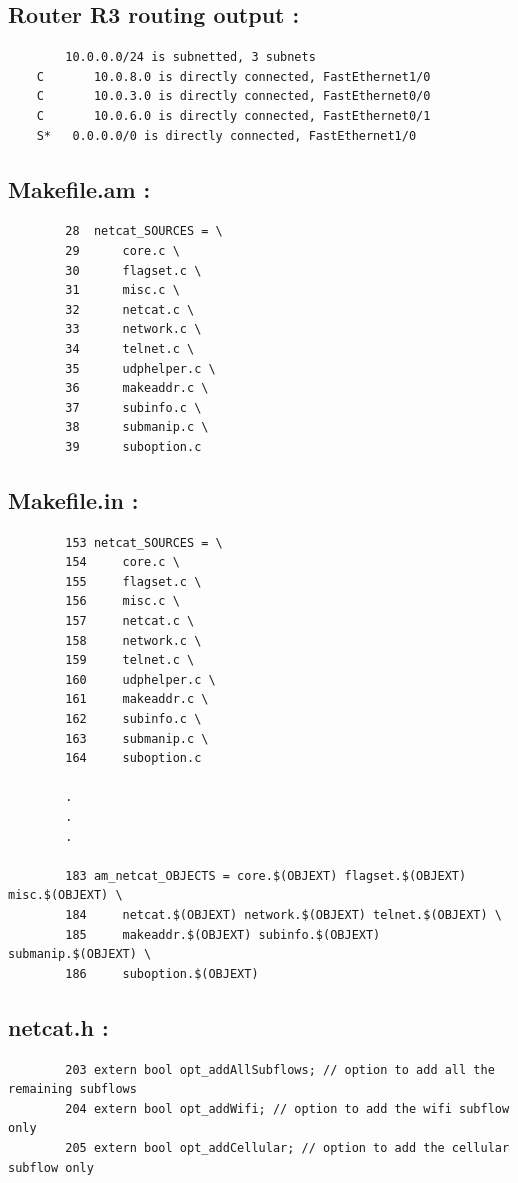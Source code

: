 \documentclass[a4paper,11pt]{article}
\begin{document}
	 	\subsection{Router R3 routing output :}
	 	\label{subsec:routerconfout3}
	 	\begin{lstlisting}
	    10.0.0.0/24 is subnetted, 3 subnets
	C       10.0.8.0 is directly connected, FastEthernet1/0
	C       10.0.3.0 is directly connected, FastEthernet0/0
	C       10.0.6.0 is directly connected, FastEthernet0/1
	S*   0.0.0.0/0 is directly connected, FastEthernet1/0
	 	\end{lstlisting}

	 	\subsection{Makefile.am :}
	 	\label{subsec:Makefile.am}
	 	\begin{lstlisting}
	 	28 	netcat_SOURCES = \
	 	29		core.c \
	 	30		flagset.c \
	 	31		misc.c \
	 	32		netcat.c \
	 	33		network.c \
	 	34		telnet.c \
	 	35		udphelper.c \
	 	36		makeaddr.c \
	 	37		subinfo.c \
	 	38		submanip.c \
	 	39		suboption.c
	 	\end{lstlisting}

	 	\subsection{Makefile.in :}
	 	\label{subsec:Makefile.in}
	 	\begin{lstlisting}
	 	153 netcat_SOURCES = \
	 	154		core.c \
	 	155		flagset.c \
	 	156		misc.c \
	 	157		netcat.c \
	 	158		network.c \
	 	159		telnet.c \
	 	160		udphelper.c \
	 	161		makeaddr.c \
	 	162		subinfo.c \
	 	163		submanip.c \
	 	164		suboption.c

	 	.
	 	.
	 	.

	 	183 am_netcat_OBJECTS = core.$(OBJEXT) flagset.$(OBJEXT) misc.$(OBJEXT) \
	 	184 	netcat.$(OBJEXT) network.$(OBJEXT) telnet.$(OBJEXT) \
	 	185 	makeaddr.$(OBJEXT) subinfo.$(OBJEXT) submanip.$(OBJEXT) \
	 	186 	suboption.$(OBJEXT)
	 	\end{lstlisting}

	 	\subsection{netcat.h :}
	 	\label{subsec:netcat.h}
	 	\begin{lstlisting}
	 	203 extern bool opt_addAllSubflows; // option to add all the remaining subflows
	 	204 extern bool opt_addWifi; // option to add the wifi subflow only
	 	205 extern bool opt_addCellular; // option to add the cellular subflow only
	 	\end{lstlisting}
\end{document}
